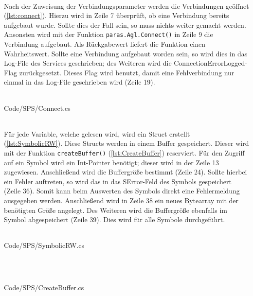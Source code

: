 \ \\
Nach der Zuweisung der Verbindungsparameter werden die Verbindungen geöffnet (\autoref{lst:connect}). Hierzu wird in Zeile 7 überprüft, ob eine Verbindung bereits aufgebaut wurde. Sollte dies der Fall sein, so muss nichts weiter gemacht werden. Ansonsten wird mit der Funktion \texttt{paras.Agl.Connect()} in Zeile 9 die Verbindung aufgebaut. Als Rückgabewert liefert die Funktion einen Wahrheitswert. Sollte eine Verbindung aufgebaut worden sein, so wird dies in das Log-File des Services geschrieben; des Weiteren wird die ConnectionErrorLogged-Flag zurückgesetzt. Dieses Flag wird benutzt, damit eine Fehlverbindung nur einmal in das Log-File geschrieben wird (Zeile 19). 
\ \\
\begin{minipage}{\textwidth}
\ \\
 {Code/SPS/Connect.cs}
\ \\
\end{minipage}
\ \\
Für jede Variable, welche gelesen wird, wird ein Struct erstellt (\autoref{lst:SymbolicRW}). Diese Structs werden in einem Buffer gespeichert. Dieser wird mit der Funktion \texttt{createBuffer()} (\autoref{lst:CreateBuffer}) reserviert. Für den Zugriff auf ein Symbol wird ein Int-Pointer benötigt; dieser wird in der Zeile 13 zugewiesen. Anschließend wird die Buffergröße bestimmt (Zeile 24). Sollte hierbei ein Fehler auftreten, so wird das in das SError-Feld des Symbols gespeichert (Zeile 36). Somit kann beim Auswerten des Symbols direkt eine Fehlermeldung ausgegeben werden. Anschließend wird in Zeile 38 ein neues Bytearray mit der benötigten Größe angelegt. Des Weiteren wird die Buffergröße ebenfalls im Symbol abgespeichert (Zeile 39). Dies wird für alle Symbole durchgeführt.
\ \\
\begin{minipage}{\textwidth}
\ \\
 {Code/SPS/SymbolicRW.cs}
\ \\
\end{minipage}
\ \\
\begin{minipage}{\textwidth}
\ \\
 {Code/SPS/CreateBuffer.cs}
\ \\
\end{minipage}


